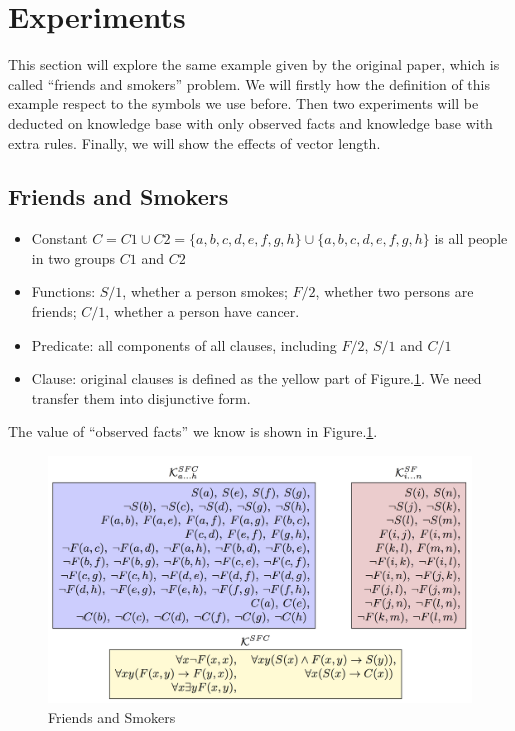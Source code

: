 
\section{Experiments}

This section will explore the same example given by the original paper, which is called ``friends and smokers'' problem. We will firstly how the definition of this example respect to the symbols we use before. Then two experiments will be deducted on knowledge base with only observed facts and knowledge base with extra rules. Finally, we will show the effects of vector length.

\subsection{Friends and Smokers}
\begin{itemize}
    \item Constant $C=C1 \cup C2=\{a,b,c,d,e,f,g,h\}\cup \{a,b,c,d,e,f,g,h\}$ is all people in two groups $C1$ and $C2$
    \item Functions: $S/1$, whether a person smokes; $F/2$, whether two persons are friends; $C/1$, whether a person have cancer.
    \item Predicate: all components of all clauses, including $F/2$, $S/1$ and $C/1$
    \item Clause: original clauses is defined as the yellow part of Figure.\ref{fig:example}. We need transfer them into disjunctive form.
\end{itemize}

The value of ``observed facts'' we know is shown in Figure.\ref{fig:example}.

\begin{figure}
    \centering
    \includegraphics[width=.7\textwidth]{img/example.png}
    \caption{Friends and Smokers}
    \label{fig:example}
\end{figure}

